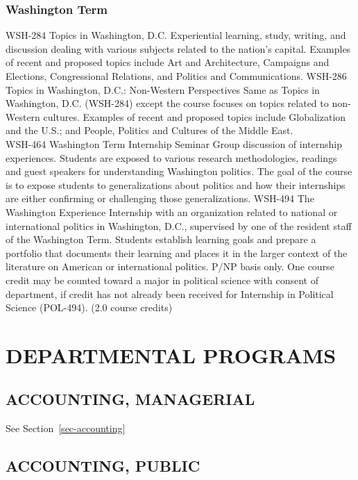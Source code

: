 \documentclass[
  letterpaper,
]{scrbook}
\begin{document}
\subsection{Washington
Term}\label{sec-academic-programs-washington-term}

WSH-284 Topics in Washington, D.C. Experiential learning, study,
writing, and discussion dealing with various subjects related to the
nation's capital. Examples of recent and proposed topics include Art and
Architecture, Campaigns and Elections, Congressional Relations, and
Politics and Communications. WSH-286 Topics in Washington, D.C.:
Non-Western Perspectives Same as Topics in Washington, D.C. (WSH-284)
except the course focuses on topics related to non-Western cultures.
Examples of recent and proposed topics include Globalization and the
U.S.; and People, Politics and Cultures of the Middle East.\\
WSH-464 Washington Term Internship Seminar Group discussion of
internship experiences. Students are exposed to various research
methodologies, readings and guest speakers for understanding Washington
politics. The goal of the course is to expose students to
generalizations about politics and how their internships are either
confirming or challenging those generalizations. WSH-494 The Washington
Experience Internship with an organization related to national or
international politics in Washington, D.C., supervised by one of the
resident staff of the Washington Term. Students establish learning goals
and prepare a portfolio that documents their learning and places it in
the larger context of the literature on American or international
politics. P/NP basis only. One course credit may be counted toward a
major in political science with consent of department, if credit has not
already been received for Internship in Political Science (POL-494).
(2.0 course credits)

\chapter{DEPARTMENTAL PROGRAMS}\label{departmental-programs}

\section{ACCOUNTING, MANAGERIAL}\label{accounting-managerial}

See Section~\ref{sec-accounting}

\section{ACCOUNTING, PUBLIC}\label{accounting-public}
\end{document}
